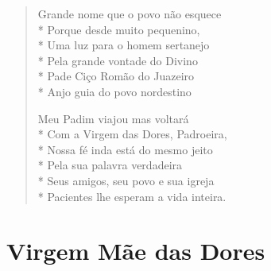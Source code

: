 \begin{verse}
Grande nome que o povo não esquece\\*
Porque desde muito pequenino,\\*
Uma luz para o homem sertanejo\\*
Pela grande vontade do Divino\\*
Pade Ciço Romão do Juazeiro\\*
Anjo guia do povo nordestino

Meu Padim viajou mas voltará\\*
Com a Virgem das Dores, Padroeira,\\*
Nossa fé inda está do mesmo jeito\\*
Pela sua palavra verdadeira\\*
Seus amigos, seu povo e sua igreja\\*
Pacientes lhe esperam a vida inteira.
\end{verse}


\chapter{Virgem Mãe das Dores}

